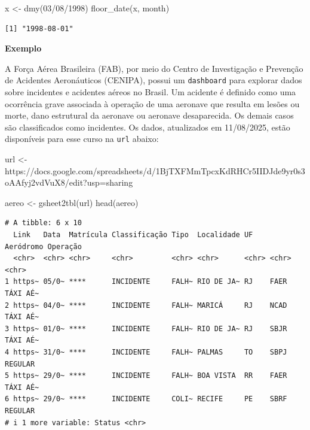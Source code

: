 \documentclass[
  letterpaper,
  DIV=11,
  numbers=noendperiod]{scrreprt}
\newenvironment{Shaded}{\begin{snugshade}}{\end{snugshade}}
\newcommand{\FunctionTok}[1]{\textcolor[rgb]{0.28,0.35,0.67}{#1}}
\newcommand{\NormalTok}[1]{\textcolor[rgb]{0.00,0.23,0.31}{#1}}
\newcommand{\OtherTok}[1]{\textcolor[rgb]{0.00,0.23,0.31}{#1}}
\newcommand{\StringTok}[1]{\textcolor[rgb]{0.13,0.47,0.30}{#1}}
\begin{document}
\begin{Shaded}
\begin{Highlighting}[]
\NormalTok{x }\OtherTok{\textless{}{-}} \FunctionTok{dmy}\NormalTok{(}\StringTok{\textquotesingle{}03/08/1998\textquotesingle{}}\NormalTok{)}
\FunctionTok{floor\_date}\NormalTok{(x, }\StringTok{\textquotesingle{}month\textquotesingle{}}\NormalTok{)}
\end{Highlighting}
\end{Shaded}

\begin{verbatim}
[1] "1998-08-01"
\end{verbatim}

\textbf{Exemplo}

A Força Aérea Brasileira (FAB), por meio do Centro de Investigação e
Prevenção de Acidentes Aeronáuticos (CENIPA), possui um
\texttt{dashboard} para explorar dados sobre incidentes e acidentes
aéreos no Brasil. Um acidente é definido como uma ocorrência grave
associada à operação de uma aeronave que resulta em lesões ou morte,
dano estrutural da aeronave ou aeronave desaparecida. Os demais casos
são classificados como incidentes. Os dados, atualizados em 11/08/2025,
estão disponíveis para esse curso na \texttt{url} abaixo:

\begin{Shaded}
\begin{Highlighting}[]
\NormalTok{url }\OtherTok{\textless{}{-}} \StringTok{\textquotesingle{}https://docs.google.com/spreadsheets/d/1BjTXFMmTpcxKdRHCr5IIDJde9yr0s3oAAfyj2vdVuX8/edit?usp=sharing\textquotesingle{}}

\NormalTok{aereo }\OtherTok{\textless{}{-}}  \FunctionTok{gsheet2tbl}\NormalTok{(url)}
\FunctionTok{head}\NormalTok{(aereo)}
\end{Highlighting}
\end{Shaded}

\begin{verbatim}
# A tibble: 6 x 10
  Link   Data  Matrícula Classificação Tipo  Localidade UF    Aeródromo Operação
  <chr>  <chr> <chr>     <chr>         <chr> <chr>      <chr> <chr>     <chr>   
1 https~ 05/0~ ****      INCIDENTE     FALH~ RIO DE JA~ RJ    FAER      TÁXI AÉ~
2 https~ 04/0~ ****      INCIDENTE     FALH~ MARICÁ     RJ    NCAD      TÁXI AÉ~
3 https~ 01/0~ ****      INCIDENTE     FALH~ RIO DE JA~ RJ    SBJR      TÁXI AÉ~
4 https~ 31/0~ ****      INCIDENTE     FALH~ PALMAS     TO    SBPJ      REGULAR 
5 https~ 29/0~ ****      INCIDENTE     FALH~ BOA VISTA  RR    FAER      TÁXI AÉ~
6 https~ 29/0~ ****      INCIDENTE     COLI~ RECIFE     PE    SBRF      REGULAR 
# i 1 more variable: Status <chr>
\end{verbatim}
\end{document}
